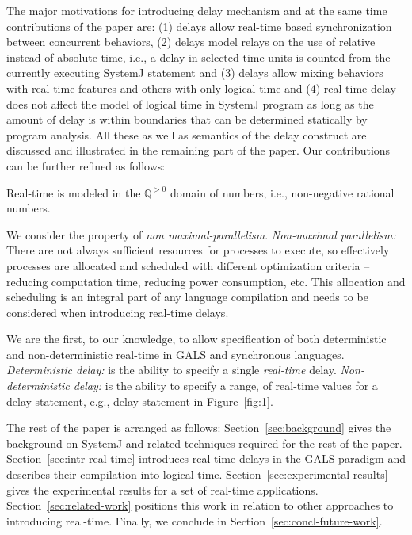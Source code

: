 The major motivations for introducing delay mechanism and at the same
time contributions of the paper are: (1) delays allow real-time based
synchronization between concurrent behaviors, (2) delays model relays on
the use of relative instead of absolute time, i.e., a delay in selected
time units is counted from the currently executing SystemJ statement and
(3) delays allow mixing behaviors with real-time features and others
with only logical time and (4) real-time delay does not affect the model
of logical time in SystemJ program as long as the amount of delay is
within boundaries that can be determined statically by program
analysis. All these as well as semantics of the delay construct are
discussed and illustrated in the remaining part of the paper. Our
contributions can be further refined as follows:
\begin{enumerate*}
\item Real-time is modeled in the $\mathbb{Q}^{>0}$ domain of numbers,
  i.e., non-negative rational numbers.
\item We consider the property of \textit{non
    maximal-parallelism}. \textit{Non-maximal parallelism:} There are
  not always sufficient resources for processes to execute, so
  effectively processes are allocated and scheduled with different
  optimization criteria -- reducing computation time, reducing power
  consumption, etc. This allocation and scheduling is an integral part
  of any language compilation and needs to be considered when
  introducing real-time delays.
\item We are the first, to our knowledge, to allow specification of both
  deterministic and non-deterministic real-time in GALS and synchronous
  languages. \textit{Deterministic delay:} is the ability to specify a
  single \textit{real-time} delay. \textit{Non-deterministic delay:} is
  the ability to specify a range, of real-time values for a delay
  statement, e.g., delay statement in Figure~\ref{fig:1}.
\end{enumerate*}

The rest of the paper is arranged as follows:
Section~\ref{sec:background} gives the background on SystemJ and related
techniques required for the rest of the
paper. Section~\ref{sec:intr-real-time} introduces real-time delays in
the GALS paradigm and describes their compilation into logical
time. Section~\ref{sec:experimental-results} gives the experimental
results for a set of real-time
applications. Section~\ref{sec:related-work} positions this work in
relation to other approaches to introducing real-time. Finally, we
conclude in Section~\ref{sec:concl-future-work}.


